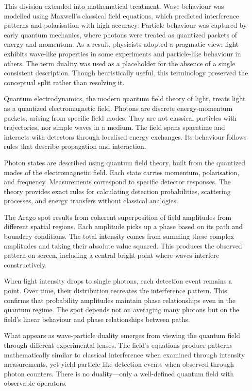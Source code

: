This division extended into mathematical treatment. Wave behaviour was modelled using Maxwell's classical field equations, which predicted interference patterns and polarisation with high accuracy. Particle behaviour was captured by early quantum mechanics, where photons were treated as quantized packets of energy and momentum. As a result, physicists adopted a pragmatic view: light exhibits wave-like properties in some experiments and particle-like behaviour in others. The term \QSOpen{}duality\QSClose{} was used as a placeholder for the absence of a single consistent description. Though heuristically useful, this terminology preserved the conceptual split rather than resolving it.

Quantum electrodynamics, the modern quantum field theory of light, treats light as a quantized electromagnetic field. Photons are discrete energy-momentum packets, arising from specific field modes. They are not classical particles with trajectories, nor simple waves in a medium. The field spans spacetime and interacts with detectors through localised energy exchanges. Its behaviour follows rules that describe propagation and interaction.

Photon states are described using quantum field theory, built from the quantized modes of the electromagnetic field. Each state carries momentum, polarisation, and frequency. Measurements correspond to specific detector responses. The theory provides exact rules for calculating detection probabilities, scattering processes, and energy transfers without classical analogies.

The Arago spot results from coherent superposition of field amplitudes from different spatial regions. Each amplitude picks up a phase based on its path and boundary conditions. The total intensity comes from summing these complex amplitudes and taking their absolute value squared. This produces the observed pattern on screen, including a central bright point where waves interfere constructively.

When light intensity drops to single photons, each detection event remains a point. Over time, their distribution recreates the interference pattern. This confirms that probability amplitudes maintain phase relationships even in the quantum regime. The spot depends not on averaging many photons but on the field's linear behaviour and phase relationships between paths.

What appears as wave-particle duality emerges from viewing the quantum field through different experimental lenses. The field's equations produce patterns mathematically similar to classical interference when examined through intensity measurements, yet yield particle-like detection events when observed through photon counters. There is no duality—only a well-defined quantum field with observable operators.

